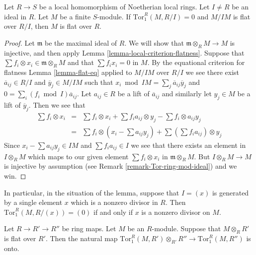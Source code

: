\begin{lemma}
\label{lemma-variant-local-criterion-flatness}
Let $R \to S$ be a local homomorphism of Noetherian
local rings. Let $I \not = R$ be an ideal in $R$.
Let $M$ be a finite $S$-module. If $\text{Tor}_1^R(M, R/I) = 0$
and $M/IM$ is flat over $R/I$, then $M$ is flat over $R$.
\end{lemma}

\begin{proof}
Let $\mathfrak m$ be the maximal ideal of $R$.
We will show that $\mathfrak m \otimes_R M \to M$ is injective,
and then apply Lemma \ref{lemma-local-criterion-flatness}.
Suppose that $\sum f_i \otimes x_i \in \mathfrak m \otimes_R M$
and that $\sum f_i x_i = 0$ in $M$. By the equational criterion
for flatness Lemma \ref{lemma-flat-eq} applied to $M/IM$
over $R/I$ we see there exist $\overline{a}_{ij} \in R/I$
and $\overline{y}_j \in M/IM$ such that
$x_i \bmod IM = \sum_j \overline{a}_{ij} \overline{y}_j $
and $0 = \sum_i (f_i \bmod I) \overline{a}_{ij}$.
Let $a_{ij} \in R$ be a lift of $\overline{a}_{ij}$ and
similarly let $y_j \in M$ be a lift of $\overline{y}_j$.
Then we see that
\begin{eqnarray*}
\sum f_i \otimes x_i
& = &
\sum f_i \otimes x_i +
\sum f_ia_{ij} \otimes y_j -
\sum f_i \otimes a_{ij} y_j
\\
& = &
\sum f_i \otimes (x_i - \sum a_{ij} y_j) +
\sum (\sum f_i a_{ij}) \otimes y_j
\end{eqnarray*}
Since $x_i - \sum a_{ij} y_j \in IM$ and
$\sum f_i a_{ij} \in I$ we see that there exists
an element in $I \otimes_R M$ which maps to our given
element $\sum f_i \otimes x_i$ in $\mathfrak m \otimes_R M$.
But $I \otimes_R M \to M$ is injective by assumption (see
Remark \ref{remark-Tor-ring-mod-ideal}) and we win.
\end{proof}

\noindent
In particular, in the situation of the lemma, suppose that
$I = (x)$ is generated by a single element $x$ which is
a nonzero divisor in $R$. Then $\text{Tor}_1^R(M, R/(x)) = (0)$
if and only if $x$ is a nonzero divisor on $M$.

\begin{lemma}
\label{lemma-surjective-on-tor-one}
Let $R \to R' \to R''$ be ring maps.
Let $M$ be an $R$-module. Suppose that $M \otimes_R R'$
is flat over $R'$. Then the natural map
$\text{Tor}_1^R(M, R') \otimes_{R'} R'' \to
\text{Tor}_1^R(M, R'')$ is onto.
\end{lemma}

